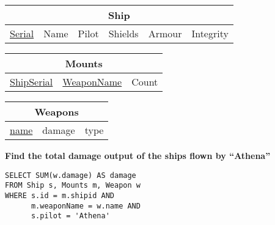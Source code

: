\documentclass{beamer}
\begin{document}
\begin{frame}[fragile]

\begin{tabular}{|c|c|c|c|c|c|}
\hline
\multicolumn{6}{|c|}{\textbf{Ship}} \\
\hline
\underline{Serial} & Name & Pilot & Shields & Armour & Integrity \\
\hline
\end{tabular}

\begin{tabular}{|c|c|c|}
\hline
\multicolumn{3}{|c|}{\textbf{Mounts}} \\
\hline
\underline{ShipSerial} & \underline{WeaponName} & Count \\
\hline
\end{tabular}

\begin{tabular}{|c|c|c|}
\hline
\multicolumn{3}{|c|}{\textbf{Weapons}} \\
\hline
\underline{name} & damage & type \\
\hline
\end{tabular}

\vspace{0.25cm}
\textbf{Find the total damage output of the ships flown by ``Athena''}

\pause
\begin{lstlisting}[showstringspaces=false]
SELECT SUM(w.damage) AS damage
FROM Ship s, Mounts m, Weapon w
WHERE s.id = m.shipid AND 
      m.weaponName = w.name AND
      s.pilot = 'Athena'
\end{lstlisting}

\end{frame}
\end{document}
